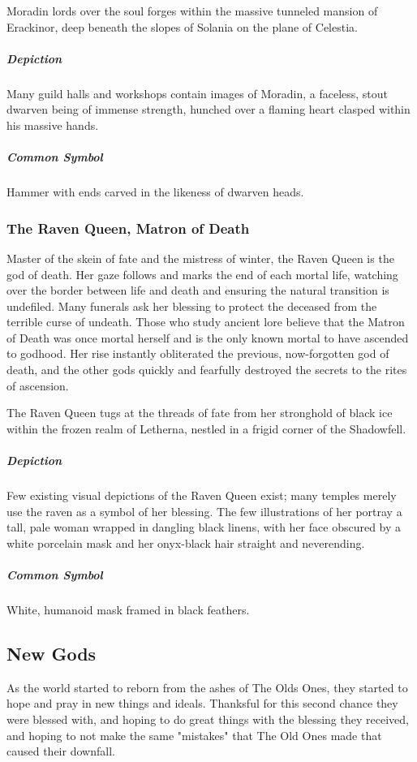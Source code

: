 \documentclass[letterpaper, twocolumn, openany, nodeprecatedcode, layout=true]{dndbook}
\begin{document}
Moradin lords over the soul forges within the massive tunneled mansion of Erackinor,
deep beneath the slopes of Solania on the plane of Celestia.

\subparagraph{Depiction}
Many guild halls and workshops contain images of Moradin, a faceless, stout dwarven
being of immense strength, hunched over a flaming heart clasped within his massive hands.

\subparagraph{Common Symbol}
Hammer with ends carved in the likeness of dwarven heads.

\subsubsection{The Raven Queen, Matron of Death}

Master of the skein of fate and the mistress of winter, the Raven Queen is the god of
death. Her gaze follows and marks the end of each mortal life, watching over the border
between life and death and ensuring the natural transition is undefiled. Many funerals
ask her blessing to protect the deceased from the terrible curse of undeath. Those who
study ancient lore believe that the Matron of Death was once mortal herself and is the
only known mortal to have ascended to godhood. Her rise instantly obliterated the previous,
now-forgotten god of death, and the other gods quickly and fearfully destroyed the secrets
to the rites of ascension.

The Raven Queen tugs at the threads of fate from her stronghold of black ice within the
frozen realm of Letherna, nestled in a frigid corner of the Shadowfell.

\subparagraph{Depiction}
Few existing visual depictions of the Raven Queen exist; many temples merely use the
raven as a symbol of her blessing. The few illustrations of her portray a tall, pale
woman wrapped in dangling black linens, with her face obscured by a white porcelain
mask and her onyx-black hair straight and neverending.

\subparagraph{Common Symbol}
White, humanoid mask framed in black feathers.

\subsection{New Gods}

As the world started to reborn from the ashes of The Olds Ones, they started to hope and
pray in new things and ideals. Thanksful for this second chance they were blessed with,
and hoping to do great things with the blessing they received, and hoping to not make
the same "mistakes" that The Old Ones made that caused their downfall.
\end{document}
